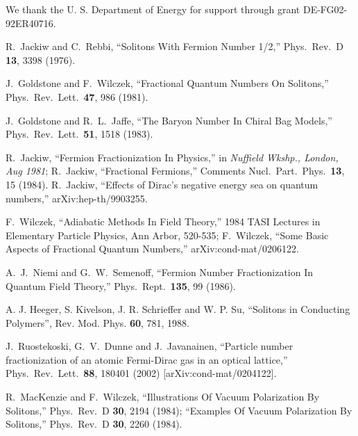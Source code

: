 \documentclass[a4paper,prd,showpacs,showkeys]{revtex4}
\begin{document}
{{\begin{acknowledgments}
We thank the U. S. Department of Energy for support through grant
DE-FG02-92ER40716.
\end{acknowledgments}




    


\begin{thebibliography}{99}

 R.~Jackiw and C.~Rebbi,
``Solitons With Fermion Number 1/2,''
Phys.\ Rev.\ D {\bf 13}, 3398 (1976).

 J.~Goldstone and F.~Wilczek,
``Fractional Quantum Numbers On Solitons,''
Phys.\ Rev.\ Lett.\  {\bf 47}, 986 (1981).

 J.~Goldstone and R.~L.~Jaffe,
``The Baryon Number In Chiral Bag Models,''
Phys.\ Rev.\ Lett.\  {\bf 51}, 1518 (1983).

 R.~Jackiw,
``Fermion Fractionization In Physics,''
in {\it Nuffield Wkshp., London, Aug 1981};  R.~Jackiw,
``Fractional Fermions,''
Comments Nucl.\ Part.\ Phys.\  {\bf 13}, 15 (1984).
R.~Jackiw,
``Effects of Dirac's negative energy sea on quantum numbers,''
arXiv:hep-th/9903255.

 F.~Wilczek,
``Adiabatic Methods In Field Theory,'' 1984 TASI Lectures in Elementary Particle Physics, Ann Arbor, 520-535;  F.~Wilczek,
``Some Basic Aspects of Fractional Quantum Numbers,''
arXiv:cond-mat/0206122.

 A.~J.~Niemi and G.~W.~Semenoff,
``Fermion Number Fractionization In Quantum Field Theory,''
Phys.\ Rept.\  {\bf 135}, 99 (1986).

 A. J. Heeger, S. Kivelson, J. R. Schrieffer and W. P. Su, ``Solitons in Conducting Polymers'', Rev. Mod. Phys. {\bf 60}, 781, 1988.

 J.~Ruostekoski, G.~V.~Dunne and J.~Javanainen,
``Particle number fractionization of an atomic Fermi-Dirac gas in an optical lattice,''
Phys.\ Rev.\ Lett.\  {\bf 88}, 180401 (2002)
[arXiv:cond-mat/0204122].

 R.~MacKenzie and F.~Wilczek,
``Illustrations Of Vacuum Polarization By Solitons,''
Phys.\ Rev.\ D {\bf 30}, 2194 (1984);
 ``Examples Of Vacuum Polarization By Solitons,''
Phys.\ Rev.\ D {\bf 30}, 2260 (1984).


\end{thebibliography}}}
\end{document}
